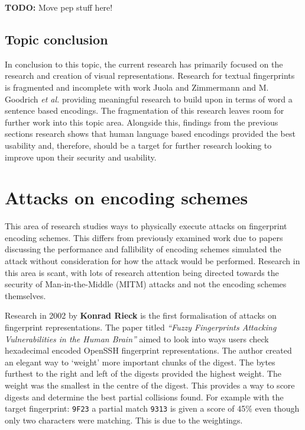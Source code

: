 \textbf{TODO: } Move pep stuff here!

\subsection{Topic conclusion}

In conclusion to this topic, the current research has primarily focused on the research and creation of visual representations. Research for textual fingerprints is fragmented and incomplete with work Juola and Zimmermann 
\cite{juola1996whole} and M. Goodrich \textit{et al.}\cite{goodrich2006loud} providing meaningful research to build upon in terms of word a sentence based encodings. The fragmentation of this research leaves room for further work into this topic area. Alongside this, findings from the previous sections research shows that human language based encodings provided the best usability and, therefore, should be a target for further research looking to improve upon their security and usability.

\section{Attacks on encoding schemes}
This area of research studies ways to physically execute attacks on fingerprint encoding schemes. This differs from previously examined work due to papers discussing the performance and fallibility of encoding schemes simulated the attack without consideration for how the attack would be performed. Research in this area is scant, with lots of research attention being directed towards the security of Man-in-the-Middle (MITM) attacks and not the encoding schemes themselves.

Research in 2002 by \textbf{Konrad Rieck}\cite{rieck2002fuzzy} is the first formalisation of attacks on fingerprint representations. The paper titled \textit{``Fuzzy Fingerprints Attacking Vulnerabilities in the Human Brain''}
aimed to look into ways users check hexadecimal encoded OpenSSH fingerprint representations. The author created an elegant way to `weight' more important chunks of the digest. The bytes furthest to the right and left of the digests provided the highest weight. The weight was the smallest in the centre of the digest. This provides a way to score digests and determine the best partial collisions found. For example with the target fingerprint: \verb|9F23| a partial match \verb|9313| is given a score of 45\% even though only two characters were matching. This is due to the weightings.

